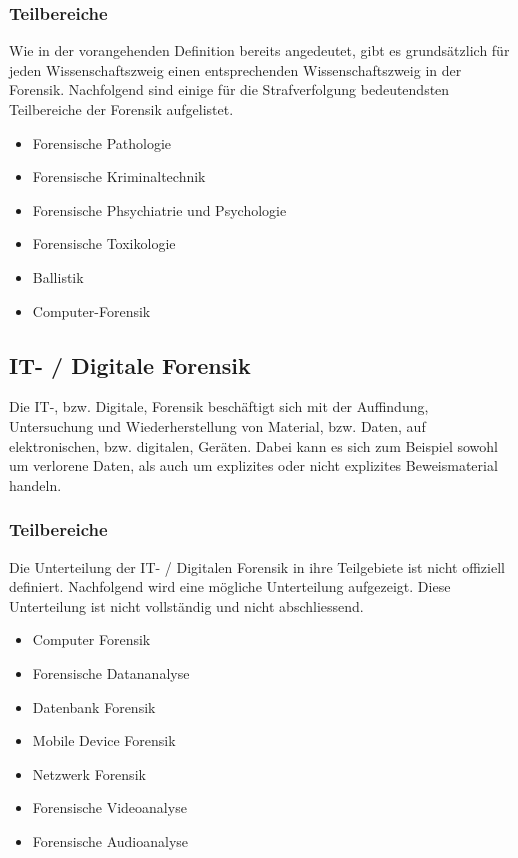 \subsubsection{Teilbereiche}
Wie in der vorangehenden Definition bereits angedeutet, gibt es grundsätzlich für jeden Wissenschaftszweig einen entsprechenden Wissenschaftszweig in der Forensik. Nachfolgend sind einige für die Strafverfolgung bedeutendsten Teilbereiche der Forensik aufgelistet. \cite{E:Gabler:Forensik}

\begin{itemize}
\item Forensische Pathologie
\item Forensische Kriminaltechnik
\item Forensische Phsychiatrie und Psychologie
\item Forensische Toxikologie
\item Ballistik
\item Computer-Forensik
\end{itemize}


\subsection{IT- / Digitale Forensik}
Die IT-, bzw. Digitale, Forensik beschäftigt sich mit der Auffindung, Untersuchung und Wiederherstellung von Material, bzw. Daten, auf elektronischen, bzw. digitalen, Geräten. Dabei kann es sich zum Beispiel sowohl um verlorene Daten, als auch um explizites oder nicht explizites Beweismaterial handeln.

\subsubsection{Teilbereiche}
Die Unterteilung der IT- / Digitalen Forensik in ihre Teilgebiete ist nicht offiziell definiert. Nachfolgend wird eine mögliche Unterteilung aufgezeigt. Diese Unterteilung ist nicht vollständig und nicht abschliessend.

\begin{itemize}
\item Computer Forensik
\item Forensische Datananalyse
\item Datenbank Forensik
\item Mobile Device Forensik
\item Netzwerk Forensik
\item Forensische Videoanalyse
\item Forensische Audioanalyse

\end{itemize}


